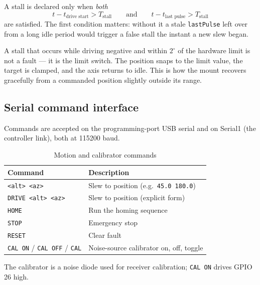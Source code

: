 \documentclass[11pt,a4paper]{article}
\begin{document}
A stall is declared only when \emph{both}
\begin{equation}
t - t_\text{drive start} > T_\text{stall}
\qquad\text{and}\qquad
t - t_\text{last pulse} > T_\text{stall}
\end{equation}
are satisfied. The first condition matters: without it a stale \texttt{lastPulse} left over from a long idle period would trigger a false stall the instant a new slew began.

A stall that occurs while driving negative and within $2^\circ$ of the hardware limit is not a fault --- it is the limit switch. The position snaps to the limit value, the target is clamped, and the axis returns to idle. This is how the mount recovers gracefully from a commanded position slightly outside its range.

\subsection{Serial command interface}

Commands are accepted on the programming-port USB serial and on Serial1 (the controller link), both at 115200 baud.

\begin{table}[H]
\centering
\caption{Motion and calibrator commands}
\begin{tabular}{ll}
\toprule
\textbf{Command} & \textbf{Description} \\
\midrule
\texttt{<alt> <az>} & Slew to position (e.g.\ \texttt{45.0 180.0}) \\
\texttt{DRIVE <alt> <az>} & Slew to position (explicit form) \\
\texttt{HOME} & Run the homing sequence \\
\texttt{STOP} & Emergency stop \\
\texttt{RESET} & Clear fault \\
\texttt{CAL ON} / \texttt{CAL OFF} / \texttt{CAL} & Noise-source calibrator on, off, toggle \\
\bottomrule
\end{tabular}
\end{table}

The calibrator is a noise diode used for receiver calibration; \texttt{CAL ON} drives GPIO 26 high.
\end{document}
